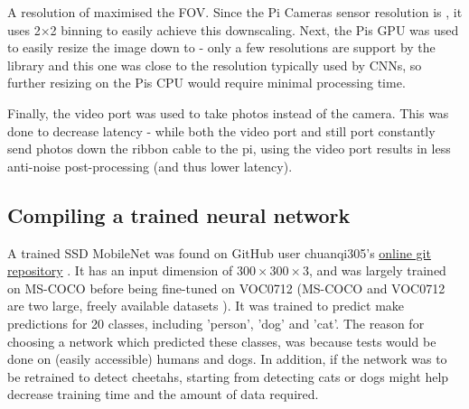 A resolution of  maximised the FOV. Since the Pi Cameras sensor resolution is , it uses 2$\times$2 binning to easily achieve this downscaling. Next, the Pis GPU was used to easily resize the image down to  - only a few resolutions are support by the library and this one was close to the resolution typically used by CNNs, so further resizing on the Pis CPU would require minimal processing time.

Finally, the video port was used to take photos instead of the camera. This was done to decrease latency - while both the video port and still port constantly send photos down the ribbon cable to the pi, using the video port results in less anti-noise post-processing (and thus lower latency).




\subsection{Compiling a trained neural network}
A trained SSD MobileNet was found on GitHub user chuanqi305's \href{https://github.com/chuanqi305/MobileNet-SSD}{online git repository} \cite{website:chuanqi305_nn_github}. It has an input dimension of $300 \times 300 \times 3$, and was largely trained on MS-COCO before being fine-tuned on VOC0712 (MS-COCO and VOC0712 are two large, freely available datasets \cite{website:mscoco_dataset, website:voc2012_dataset}). It was trained to predict make predictions for 20 classes, including 'person', 'dog' and 'cat'. The reason for choosing a network which predicted these classes, was because tests would be done on (easily accessible) humans and dogs. In addition, if the network was to be retrained to detect cheetahs, starting from detecting cats or dogs might help decrease training time and the amount of data required.

